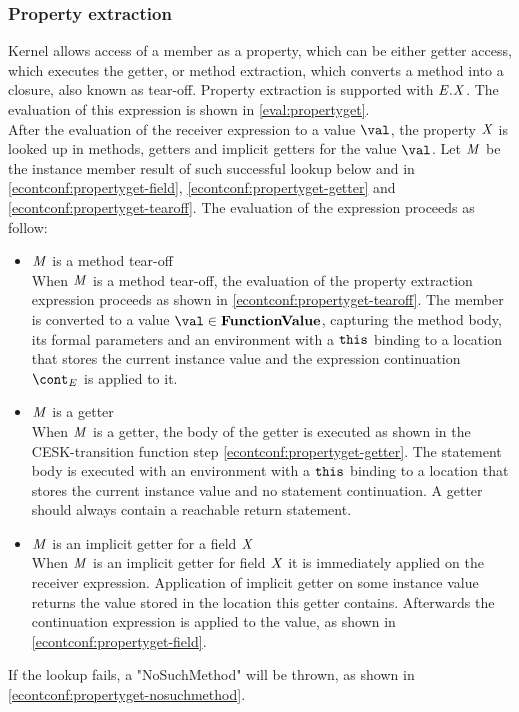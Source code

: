 \documentclass{article}
\begin{document}
\subsubsection{Property extraction}
\label{subsubsec:property-extraction}
Kernel allows access of a member as a property, which can be either getter access, which executes the getter, or method extraction, which converts a method into a closure, also known as tear-off.
Property extraction is supported with $\mathit{E}.\mathit{X}$.
The evaluation of this expression is shown in \eqref{eval:propertyget}.\\
\noindent
After the evaluation of the receiver expression to a value $\val$, the property $\mathit{X}$ is looked up in methods, getters and implicit getters for the value $\val$.
Let $\mathit{M}$ be the instance member result of such successful lookup below and in \eqref{econtconf:propertyget-field}, \eqref{econtconf:propertyget-getter} and \eqref{econtconf:propertyget-tearoff}.
The evaluation of the expression proceeds as follow: 
\begin{itemize}
\item $\mathit{M}$ is a method tear-off\\
When $\mathit{M}$ is a method tear-off, the evaluation of the property extraction expression proceeds as shown in \eqref{econtconf:propertyget-tearoff}.
The member is converted to a value $\val \in \dfunval$, capturing the method body, its formal parameters and an environment with a $\tt{this}$ binding to a location that stores the current instance value and the expression continuation $\econt$ is applied to it.
\item $\mathit{M}$ is a getter\\
When $\mathit{M}$ is a getter, the body of the getter is executed as shown in the CESK-transition function step \eqref{econtconf:propertyget-getter}.
The statement body is executed with an environment with a $\tt{this}$ binding to a location that stores the current instance value and no statement continuation.
A getter should always contain a reachable return statement.
\item $\mathit{M}$ is an implicit getter for a field $\mathit{X}$\\
When $\mathit{M}$ is an implicit getter for field $\mathit{X}$ it is immediately applied on the receiver expression.
Application of implicit getter on some instance value returns the value stored in the location this getter contains.
Afterwards the continuation expression is applied to the value, as shown in \eqref{econtconf:propertyget-field}.
\end{itemize}
If the lookup fails, a "NoSuchMethod" will be thrown, as shown in \eqref{econtconf:propertyget-nosuchmethod}.
%
%
\end{document}

